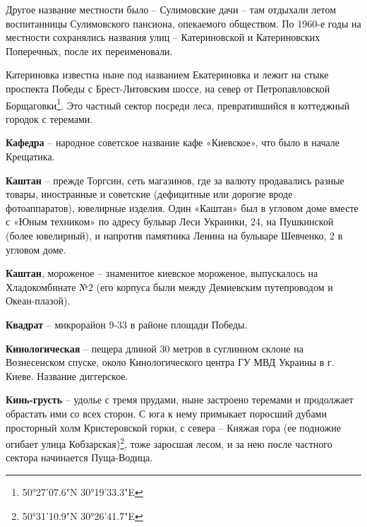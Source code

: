 Другое название местности было – Сулимовские дачи  – там отдыхали летом воспитанницы Сулимовского пансиона, опекаемого обществом. По 1960-е годы на местности сохранялись названия улиц – Катериновской и Катериновских Поперечных, после их переименовали. 

Катериновка известна ныне под названием Екатериновка и лежит на стыке проспекта Победы с Брест-Литовским шоссе, на север от Петропавловской Борщаговки\footnote{50°27'07.6"N 30°19'33.3"E}. Это частный сектор посреди леса, превратившийся в коттеджный городок с теремами.\\

\medskip

\textbf{Кафедра} – народное советское название кафе «Киевское», что было в начале Крещатика.\\

\medskip

\textbf{Каштан} – прежде Торгсин, сеть магазинов, где за валюту продавались разные товары, иностранные и советские (дефицитные или дорогие вроде фотоаппаратов), ювелирные изделия. Один «Каштан» был в угловом доме вместе с «Юным техником» по адресу бульвар Леси Украинки, 24, на Пушкинской (более ювелирный), и напротив памятника Ленина на бульваре Шевченко, 2 в угловом доме.\\

\medskip

\textbf{Каштан}, мороженое – знаменитое киевское мороженое, выпускалось на Хладокомбинате №2 (его корпуса были между Демиевским путепроводом и Океан-плазой).\\

\medskip

\textbf{Квадрат} – микрорайон 9-33 в районе площади Победы.\\

\medskip

\textbf{Кинологическая} – пещера длиной 30 метров в суглинном склоне на Вознесенском спуске, около Кинологического центра ГУ МВД Украины в г. Киеве. Название диггерское.\\

\medskip

\textbf{Кинь-грусть} – удолье с тремя прудами, ныне застроено теремами и продолжает обрастать ими со всех сторон. С юга к нему примыкает поросший дубами просторный холм Кристеровской горки, с севера – Княжая гора (ее подножие огибает улица Кобзарская)\footnote{50°31'10.9"N 30°26'41.7"E}, тоже заросшая лесом, и за нею после частного сектора начинается Пуща-Водица. 

